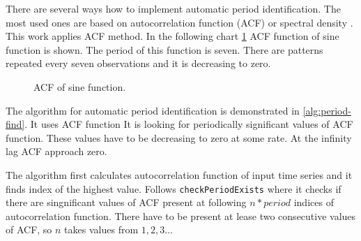     There are several ways how to implement automatic period identification. The most used ones are based on
    autocorrelation function (ACF) or spectral density \cite{period-hydman}. This work applies ACF method.
    In the following chart \ref{img:period-acf} ACF function of sine function is shown. The period of this
    function is seven. There are patterns repeated every seven observations and it is decreasing to zero.

    \begin{figure}[H]
        \begin{center}
            \caption{ACF of sine function.}
            \label{img:period-acf}
        \end{center}
    \end{figure}

    The algorithm for automatic period identification is demonstrated in \ref{alg:period-find}. It uses ACF function
    It is looking for periodically significant values of ACF function. These values have to be decreasing to zero at
    some rate. At the infinity lag ACF approach zero.

    The algorithm first calculates autocorrelation function of input time series and it finds index of the highest
    value. Follows \texttt{checkPeriodExists} where it checks if there are singnificant values of ACF present at following $n*period$
    indices of autocorrelation function. There have to be present at lease two consecutive values of ACF, so $n$ takes
    values from $1,2,3\dots$

